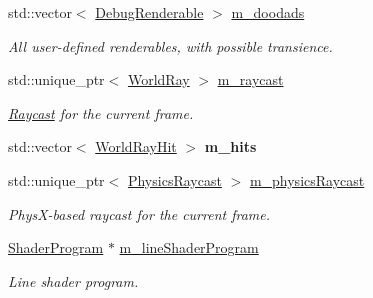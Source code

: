 \begin{Indent}
\begin{DoxyCompactItemize}
\mbox{\label{classrev_1_1_debug_manager_a2645160b7c2a8672fd50f5d641193aeb}} 
std\+::vector$<$ \mbox{\hyperlink{structrev_1_1_debug_manager_1_1_debug_renderable}{Debug\+Renderable}} $>$ \mbox{\hyperlink{classrev_1_1_debug_manager_a2645160b7c2a8672fd50f5d641193aeb}{m\+\_\+doodads}}
\begin{DoxyCompactList}\small\item\em All user-\/defined renderables, with possible transience. \end{DoxyCompactList}\item 
\mbox{\label{classrev_1_1_debug_manager_a5fbc828e4a7dc27c218d8927470305c1}} 
std\+::unique\+\_\+ptr$<$ \mbox{\hyperlink{classrev_1_1_world_ray}{World\+Ray}} $>$ \mbox{\hyperlink{classrev_1_1_debug_manager_a5fbc828e4a7dc27c218d8927470305c1}{m\+\_\+raycast}}
\begin{DoxyCompactList}\small\item\em \mbox{\hyperlink{class_raycast}{Raycast}} for the current frame. \end{DoxyCompactList}\item 
\mbox{\label{classrev_1_1_debug_manager_a6267793937809af79a71ecc57666bd4e}} 
std\+::vector$<$ \mbox{\hyperlink{structrev_1_1_world_ray_hit}{World\+Ray\+Hit}} $>$ {\bfseries m\+\_\+hits}
\item 
\mbox{\label{classrev_1_1_debug_manager_a4e55663a146410d1b74b7dcaa90f979b}} 
std\+::unique\+\_\+ptr$<$ \mbox{\hyperlink{classrev_1_1_physics_raycast}{Physics\+Raycast}} $>$ \mbox{\hyperlink{classrev_1_1_debug_manager_a4e55663a146410d1b74b7dcaa90f979b}{m\+\_\+physics\+Raycast}}
\begin{DoxyCompactList}\small\item\em Phys\+X-\/based raycast for the current frame. \end{DoxyCompactList}\item 
\mbox{\label{classrev_1_1_debug_manager_a212ed5b90f2235c5a4cff32909e91bab}} 
\mbox{\hyperlink{classrev_1_1_shader_program}{Shader\+Program}} $\ast$ \mbox{\hyperlink{classrev_1_1_debug_manager_a212ed5b90f2235c5a4cff32909e91bab}{m\+\_\+line\+Shader\+Program}}
\begin{DoxyCompactList}\small\item\em Line shader program. \end{DoxyCompactList}\item 

\end{DoxyCompactItemize}
\end{Indent}

